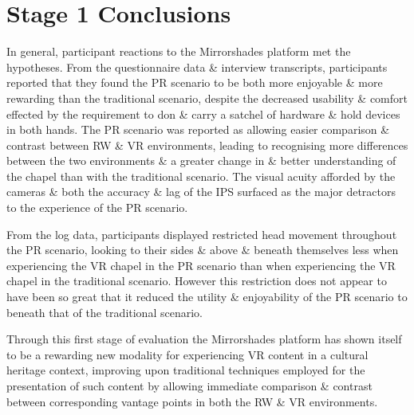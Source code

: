 
\section{Stage 1 Conclusions}

In general, participant reactions to the Mirrorshades platform met the hypotheses. From the questionnaire data \& interview transcripts, participants reported that they found the PR scenario to be both more enjoyable \& more rewarding than the traditional scenario, despite the decreased usability \& comfort effected by the requirement to don \& carry a satchel of hardware \& hold devices in both hands. The PR scenario was reported as allowing easier comparison \& contrast between RW \& VR environments, leading to recognising more differences between the two environments \& a greater change in \& better understanding of the chapel than with the traditional scenario. The visual acuity afforded by the cameras \& both the accuracy \& lag of the IPS surfaced as the major detractors to the experience of the PR scenario.

From the log data, participants displayed restricted head movement throughout the PR scenario, looking to their sides \& above \& beneath themselves less when experiencing the VR chapel in the PR scenario than when experiencing the VR chapel in the traditional scenario. However this restriction does not appear to have been so great that it reduced the utility \& enjoyability of the PR scenario to beneath that of the traditional scenario.

Through this first stage of evaluation the Mirrorshades platform has shown itself to be a rewarding new modality for experiencing VR content in a cultural heritage context, improving upon traditional techniques employed for the presentation of such content by allowing immediate comparison \& contrast between corresponding vantage points in both the RW \& VR environments.


